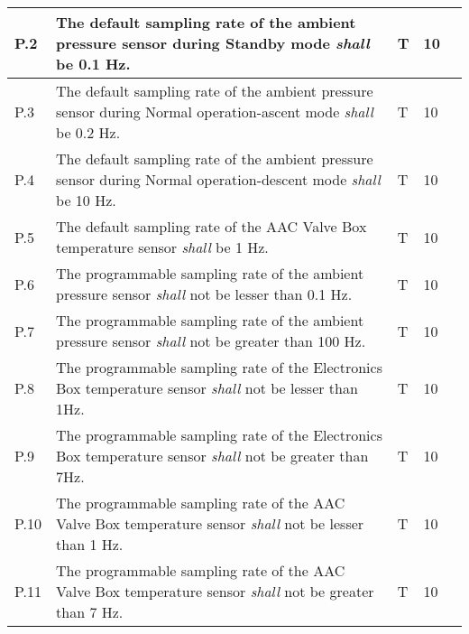 \begin{longtable}[]{|m{}| m{} |m{} |m{}|m{}|}
P.2  & The default sampling rate of the ambient pressure sensor during Standby mode \textit{shall} be 0.1 Hz.                                                                           &      T        & 10            &        \\ \hline
P.3  & The default sampling rate of the ambient pressure sensor during Normal operation-ascent mode \textit{shall} be 0.2 Hz.                                                           &      T        & 10            &        \\ \hline
P.4  & The default sampling rate of the ambient pressure sensor during Normal operation-descent mode \textit{shall} be 10 Hz.                                                           &       T       & 10            &        \\ \hline
P.5  & The default sampling rate of the AAC Valve Box temperature sensor \textit{shall} be 1 Hz.                                                                                        &      T        & 10            &        \\ \hline
P.6  & The programmable sampling rate of the ambient pressure sensor \textit{shall} not be lesser than 0.1 Hz.                                                                          &      T        & 10            &        \\ \hline
P.7  & The programmable sampling rate of the ambient pressure sensor \textit{shall} not be greater than 100 Hz.                                                                         &       T       & 10            &        \\ \hline
P.8  & The programmable sampling rate of the Electronics Box temperature sensor \textit{shall} not be lesser than 1Hz.                                                                          &       T       & 10            &        \\ \hline
P.9  & The programmable sampling rate of the Electronics Box temperature sensor \textit{shall} not be greater than 7Hz.                                                                         &        T      & 10            &        \\ \hline
P.10 & The programmable sampling rate of the AAC Valve Box temperature sensor \textit{shall} not be lesser than 1 Hz.                                                                   &        T      & 10            &        \\ \hline
P.11 & The programmable sampling rate of the AAC Valve Box temperature sensor \textit{shall} not be greater than 7 Hz.                                                                  &        T      & 10            &        \\ \hline

\end{longtable}

